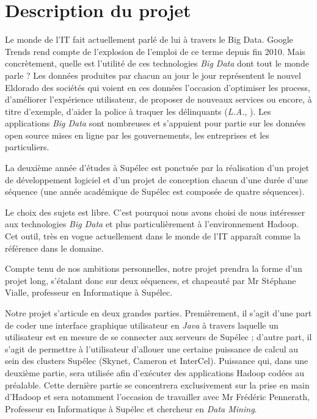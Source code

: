 \section{Description du projet}

\par Le monde de l'IT fait actuellement parlé de lui à travers le Big Data. Google Trends rend compte de l'explosion de l'emploi de ce terme depuis fin 2010. Mais concrètement, quelle est l'utilité de ces technologies \emph{Big Data} dont tout le monde parle ? Les données produites par chacun au jour le jour représentent le nouvel Eldorado des sociétés qui voient en ces données l'occasion d'optimiser les process, d'améliorer l'expérience utilisateur, de proposer de nouveaux services ou encore, à titre d'exemple, d'aider la police à traquer les délinquants (\emph{L.A.}, ). Les applications \emph{Big Data} sont nombreuses et s'appuient pour partie sur les données open source mises en ligne par les gouvernements, les entreprises et les particuliers.

\par La deuxième année d'études à Supélec est ponctuée par la réalisation d'un projet de développement logiciel et d'un projet de conception chacun d'une durée d'une séquence (une année académique de Supélec est composée de quatre séquences).

\par Le choix des sujets est libre. C'est pourquoi nous avons choisi de nous intéresser aux technologies \emph{Big Data} et plus particulièrement à l'environnement Hadoop. Cet outil, très en vogue actuellement dans le monde de l'IT apparaît comme la référence dans le domaine.

\par Compte tenu de nos ambitions personnelles, notre projet prendra la forme d'un projet long, s'étalant donc sur deux séquences, et chapeauté par Mr Stéphane Vialle, professeur en Informatique à Supélec.

\par Notre projet s'articule en deux grandes parties. Premièrement, il s'agit d'une part de coder une interface graphique utilisateur en \emph{Java} à travers laquelle un utilisateur est en mesure de se connecter aux serveurs de Supélec ; d'autre part, il s'agit de permettre à l'utilisateur d'allouer une certaine puissance de calcul au sein des clusters Supélec (Skynet, Cameron et InterCel). Puissance qui, dans une deuxième partie, sera utilisée afin d'exécuter des applications Hadoop codées au préalable. Cette dernière partie se concentrera exclusivement sur la prise en main d'Hadoop et sera notamment l'occasion de travailler avec Mr Frédéric Pennerath, Professeur en Informatique à Supélec et chercheur en \emph{Data Mining}.



